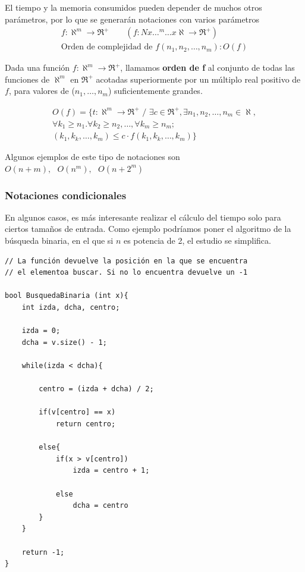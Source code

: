 \documentclass[10pt,a4paper,spanish]{report}
\theoremstyle{definition}
\theoremstyle{remark}
\begin{document}
    El tiempo y la memoria consumidos pueden depender de muchos otros parámetros, por lo que se generarán notaciones con varios parámetros
    \begin{align*}
        f:\aleph^m \rightarrow \Re^+ \qquad (f:Nx\ldots^m\ldots x\aleph \rightarrow \Re^+)\\ \text{Orden de complejidad de } f(n_1, n_2, \ldots, n_m): O(f)
    \end{align*}

    Dada una función $f:\aleph^m\rightarrow \Re^+$, llamamos \textbf{\textcolor{YellowOrange}{orden de f}} al conjunto de todas las funciones de $\aleph^m$ en $\Re^+$ acotadas superiormente por un múltiplo real positivo de $f$, para valores de ($n_1,\ldots,n_m$) suficientemente grandes.

    \begin{align*}
        O(f) = \{t:\aleph^m \rightarrow \Re^+ \text{ / } \exists c \in \Re^+, \exists n_1, n_2, \ldots, n_m \in \aleph,\\ \forall k_1 \ge n_1. \forall k_2 \ge n_2, \ldots, \forall k_m \ge n_m;\\ (k_1,k_k,\ldots,k_m) \leq c \cdot f(k_1,k_k,\ldots,k_m)\}
    \end{align*}

    Algunos ejemplos de este tipo de notaciones son $O(n+m), \text{ } O(n^m), \text{ } O(n+2^m)$

    \subsubsection{\textcolor{YellowOrange}Notaciones condicionales}

    En algunos casos, es más interesante realizar el cálculo del tiempo solo para ciertos tamaños de entrada. Como ejemplo podríamos poner el algoritmo de la búsqueda binaria, en el que si $n$ es potencia de 2, el estudio se simplifica.

    \begin{verbatim}
// La función devuelve la posición en la que se encuentra
// el elementoa buscar. Si no lo encuentra devuelve un -1

bool BusquedaBinaria (int x){
    int izda, dcha, centro;

    izda = 0;
    dcha = v.size() - 1;

    while(izda < dcha){

        centro = (izda + dcha) / 2;

        if(v[centro] == x)
            return centro;
        
        else{
            if(x > v[centro])
                izda = centro + 1;

            else
                dcha = centro
        }
    }

    return -1;
}
    \end{verbatim}
\end{document}
